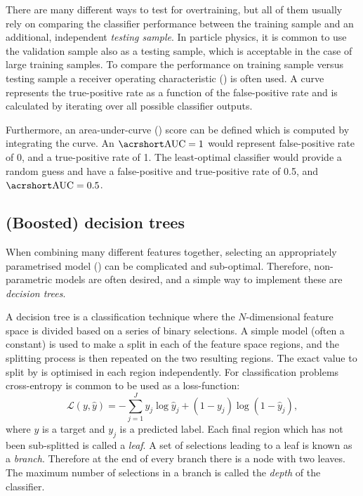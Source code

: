 \begin{figure}[htbp!]
\end{figure}

There are many different ways to test for overtraining, but all of them usually rely on comparing the classifier performance between the training sample and an additional, independent \textit{testing sample}.
In particle physics, it is common to use the validation sample also as a testing sample, which is acceptable in the case of large training samples.
To compare the performance on training sample versus testing sample a receiver operating characteristic (\ROC) is often used.
A \ROC curve represents the true-positive rate as a function of the false-positive rate and is calculated by iterating over all possible \MVA classifier outputs.

Furthermore, an area-under-curve (\AUC) score can be defined which is computed by integrating the \ROC curve.
An $\mathrm{\AUC}=1$ would represent false-positive rate of 0, and a true-positive rate of 1. 
The least-optimal classifier would provide a random guess and have a false-positive and true-positive rate of 0.5, and $\mathrm{\AUC}=0.5$.

\subsection{(Boosted) decision trees}

When combining many different features together, selecting an appropriately parametrised model () can be complicated and sub-optimal.
Therefore, non-parametric models are often desired, and a simple way to implement these are \textit{decision trees}.

A decision tree is a classification technique where the $N$-dimensional feature space is divided based on a series of binary selections.
A simple model (often a constant) is used to make a split in each of the feature space regions, and the splitting process is then repeated on the two resulting regions.
The exact value to split by is optimised in each region independently.
For classification problems cross-entropy is common to be used as a loss-function:
\begin{equation}
    \mathcal{L}(y,\hat{y})=-\sum_{j=1}^J y_j\log \hat{y}_j + (1-y_j)\log(1-\hat{y}_j),
\end{equation}
where $y$ is a target and $y_j$ is a predicted label.
Each final region which has not been sub-splitted is called a \textit{leaf}.
A set of selections leading to a leaf is known as a \textit{branch}. 
Therefore at the end of every branch there is a node with two leaves.
The maximum number of selections in a branch is called the \textit{depth} of the classifier.


